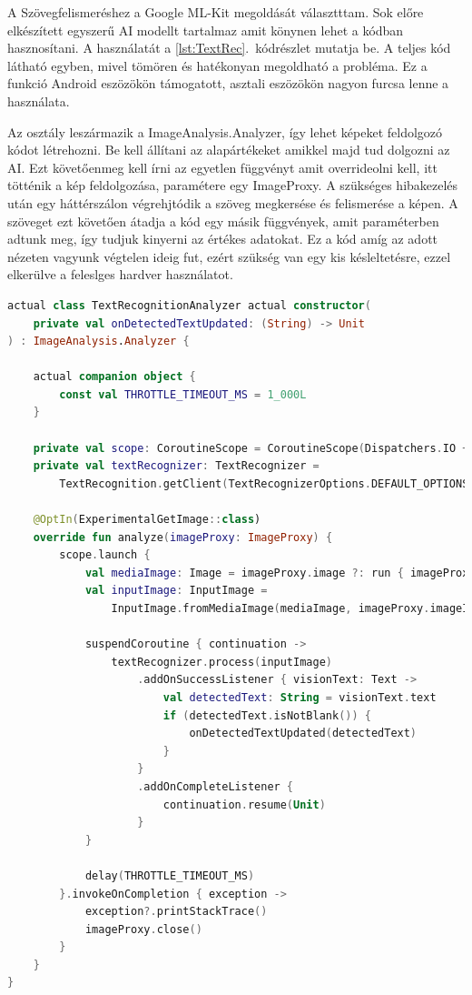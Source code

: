 A Szövegfelismeréshez a Google ML-Kit megoldását választttam.
Sok előre elkészített egyszerű AI modellt tartalmaz amit könynen lehet a kódban hasznosítani.
A használatát a \ref{lst:TextRec}.~kódrészlet mutatja be. 
A teljes kód látható egyben, mivel tömören és hatékonyan megoldható a probléma.
Ez a funkció Android eszözökön támogatott, asztali eszözökön nagyon furcsa lenne a használata.

Az osztály leszármazik a ImageAnalysis.Analyzer, így lehet képeket feldolgozó kódot létrehozni.
Be kell állítani az alapártékeket amikkel majd tud dolgozni az AI.
Ezt követőenmeg kell írni az egyetlen függvényt amit overrideolni kell, itt tötténik a kép feldolgozása, paramétere egy ImageProxy.
A szükséges hibakezelés után egy háttérszálon végrehjtódik a szöveg megkersése és felismerése a képen.
A szöveget ezt követően átadja a kód egy másik függvények, amit paraméterben adtunk meg, így tudjuk kinyerni az értékes adatokat.
Ez a kód amíg az adott nézeten vagyunk végtelen ideig fut, ezért szükség van egy kis késleltetésre, ezzel elkerülve a feleslges hardver használatot.

\begin{lstlisting}[caption={Szövegfelismerés.}, label={lst:TextRec}, language=Kotlin]
actual class TextRecognitionAnalyzer actual constructor(
    private val onDetectedTextUpdated: (String) -> Unit
) : ImageAnalysis.Analyzer {

    actual companion object {
        const val THROTTLE_TIMEOUT_MS = 1_000L
    }

    private val scope: CoroutineScope = CoroutineScope(Dispatchers.IO + SupervisorJob())
    private val textRecognizer: TextRecognizer =
        TextRecognition.getClient(TextRecognizerOptions.DEFAULT_OPTIONS)

    @OptIn(ExperimentalGetImage::class)
    override fun analyze(imageProxy: ImageProxy) {
        scope.launch {
            val mediaImage: Image = imageProxy.image ?: run { imageProxy.close(); return@launch }
            val inputImage: InputImage =
                InputImage.fromMediaImage(mediaImage, imageProxy.imageInfo.rotationDegrees)

            suspendCoroutine { continuation ->
                textRecognizer.process(inputImage)
                    .addOnSuccessListener { visionText: Text ->
                        val detectedText: String = visionText.text
                        if (detectedText.isNotBlank()) {
                            onDetectedTextUpdated(detectedText)
                        }
                    }
                    .addOnCompleteListener {
                        continuation.resume(Unit)
                    }
            }

            delay(THROTTLE_TIMEOUT_MS)
        }.invokeOnCompletion { exception ->
            exception?.printStackTrace()
            imageProxy.close()
        }
    }
}
\end{lstlisting}